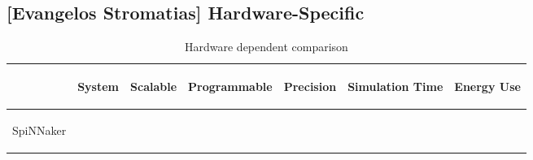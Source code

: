 \subsection{[Evangelos Stromatias] Hardware-Specific}
\label{subsec:hw}
\begin{table*}[thb!]
  \caption{Hardware dependent comparison}
  \begin{center}
      \bgroup
      \def\arraystretch{1.4}
    \begin{tabular}{l c c c c c c}
      $ $ & 
       \begin{mycell}{2.0cm} System \end{mycell} & 
       \begin{mycell}{2.0cm} Scalable \end{mycell} & 
       \begin{mycell}{2.0cm} Programmable \end{mycell} & 
       \begin{mycell}{2.0cm} Precision \end{mycell} &  
       \begin{mycell}{2.0cm} Simulation Time \end{mycell} & 
       \begin{mycell}{2.0cm} Energy Use \end{mycell} 
	   \\
       \hline
       \begin{mycell}{1.8cm} SpiNNaker \citep{strometal} \end{mycell} &

\end{tabular}
\end{center}
\end{table*}
